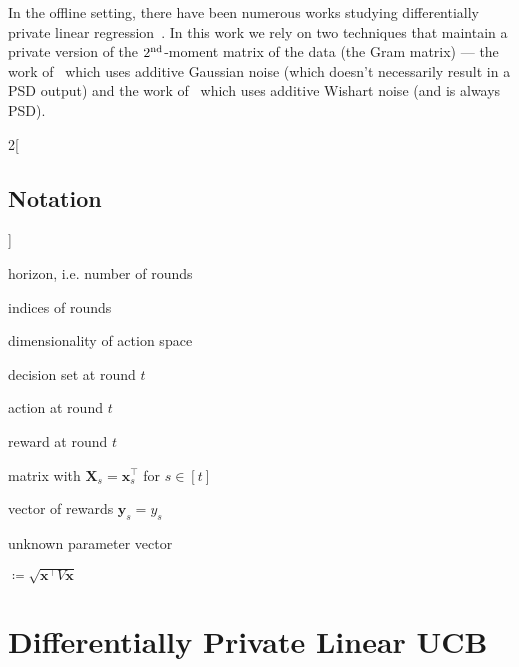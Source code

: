\documentclass{article}
\renewcommand{\vec}[1]{\bm{#1}}
\newcommand{\defeq}{\coloneq}
\newcommand{\Real}{\mathds{R}}
\providecommand\transp{\top}
\let\transpsymbol\transp
\renewcommand{\transp}[1]{#1^\transpsymbol}
\newcommand{\Dset}[1]{\mathcal{D}_{#1}}
\begin{document}
In the offline setting, there have been numerous works studying differentially private linear regression~\cite{ChaudhuriMonteleoniSarwate2011, BassilySmithThakurta2014}. In this work we rely on two techniques that maintain a private version of the $2^{\rm nd}$-moment matrix of the data (the Gram matrix) --- the work of~\cite{DworkTTZ14} which uses additive Gaussian noise (which doesn't necessarily result in a PSD output) and the work of~\cite{SheffetPrivateApproxRegression2015} which uses additive Wishart noise (and is always PSD).

\begin{multicols}{2}[\subsection{Notation}\label{sec:notation}]
  \nolinenumbers
  \begin{description}[style=sameline,leftmargin=5em]
  \item[$n$] horizon, i.e. number of rounds
  \item[$s,t$] indices of rounds
  \item[$d$] dimensionality of action space
  \item[$\Dset{t}\subset\Real^d$] decision set at round $t$
  \item[$\vec x_t \in \Dset{t}$] action at round $t$
  \item[$y_t \in \Real$] reward at round $t$
  \item[$\vec X_t \in \Real^{t\times d}$] matrix with $\vec X_s = \transp{\vec
      x_s}$ for $s\in[t]$
  \item[$\vec y_t \in \Real^t$] vector of rewards $\vec y_s = y_s$
  \item[$\vec\theta^* \in \Real^d$] unknown parameter vector
  \item[$\norm{V}{\vec x}$] $\defeq \sqrt{\transp{\vec x} V \vec x}$
  \end{description}
  \linenumbers
\end{multicols}

\section{Differentially Private Linear UCB}
\end{document}
